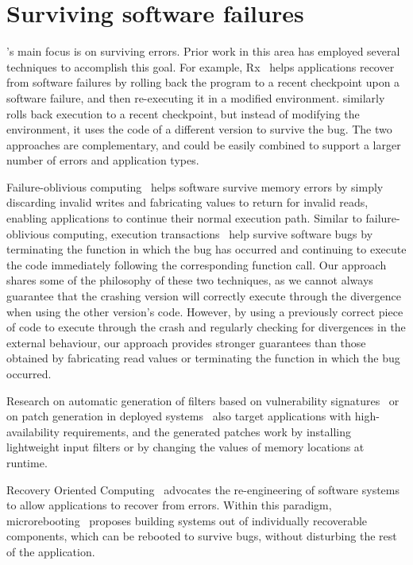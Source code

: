 \section{Surviving software failures}

\mx's main focus is on surviving errors.  Prior work in this area has 
employed several techniques to accomplish this goal.  For example,
Rx~\cite{rx} helps applications recover from software failures by
rolling back the program to a recent checkpoint upon a software
failure, and then re-executing it in a modified environment.  \mx
similarly rolls back execution to a recent checkpoint, but instead of
modifying the environment, it uses the code of a different version to
survive the bug.  The two approaches are complementary, and could be
easily combined to support a larger number of errors and application
types.

Failure-oblivious computing~\cite{fo} helps software survive memory
errors by simply discarding invalid writes and fabricating values to
return for invalid reads, enabling applications to continue their
normal execution path.  Similar to failure-oblivious computing,
execution transactions~\cite{exec-trans06} help survive software bugs
by terminating the function in which the bug has occurred and
continuing to execute the code immediately following the
corresponding function call.  Our approach shares some of the
philosophy of these two techniques, as we cannot always guarantee that
the crashing version will correctly execute through the divergence
when using the other version's code.
However, by using a previously correct piece of code to execute
through the crash and regularly checking for divergences in the
external behaviour, our approach provides stronger guarantees than
those obtained by fabricating read values or terminating the function
in which the bug occurred.

Research on automatic generation of filters based on vulnerability
signatures~\cite{song:oakland06,vigilante} 
or on patch
generation in deployed systems~\cite{clearview}
also target applications with high-availability requirements, and the
generated patches work by installing lightweight input filters or by changing
the values of memory locations at runtime.

Recovery Oriented Computing~\cite{roc} advocates the re-engineering of
software systems to allow applications to recover from errors.  Within
this paradigm, microrebooting~\cite{microreboots} proposes building
systems out of individually recoverable components, which can be
rebooted to survive bugs, without disturbing the rest of the
application.

